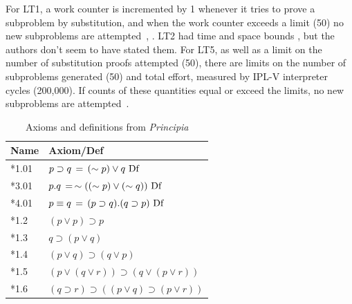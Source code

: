\documentclass[journal]{IEEEtran}
\begin{document}
%
%
For LT1, a work counter is incremented by 1 whenever it tries
to prove a subproblem by substitution, and when the work counter
exceeds a limit (50) no new subproblems are 
attempted~\cite{moewsrepo}, \cite[p.~47]{LT1956b}.
LT2 had time and space bounds \cite[p.~223]{LT1957},
but the authors don't seem to have stated them.
%
%
For LT5, as well as a limit on the number of substitution proofs
attempted (50), there are limits on the number of subproblems
generated (50) and total effort, measured by IPL-V interpreter cycles (200,000).
If counts of these quantities equal or exceed the limits,
no new subproblems are attempted~\cite[pp.~154-155]{stefferud1963lt}.

%
%
\begin{table}[h]
\centering
\caption{Axioms and definitions from \textit{Principia}}
\label{tab:axioms}
\begin{tabular}{ll}
\toprule
\textbf{Name} & \textbf{Axiom/Def}\\
\midrule
*1.01  & $p\supset q \, = \,(\sim p) \vee q\ {\rm Df}$\\
*3.01  & 
$p.q \, = \, \sim((\sim p)\vee (\sim q))\ {\rm Df}$\\
*4.01  & $p\equiv q\, = \, (p\supset q).(q\supset p)\ {\rm Df}$\\
*1.2   & $(p\vee p)\supset p$\\
*1.3   & $q\supset(p\vee q)$\\
*1.4   & $(p\vee q)\supset(q \vee p)$\\
*1.5   & $(p\vee(q\vee r))\supset (q\vee(p \vee r))$\\
*1.6   & $(q\supset r)\supset((p\vee q)\supset(p\vee r))$\\
\bottomrule
\end{tabular}
\end{table}
\end{document}
